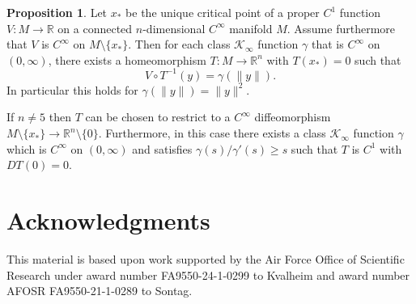 \documentclass[11pt]{amsart}
\newcommand{\R}{\mathbb{R}}
\theoremstyle{definition}
\newtheorem{Prop}{Proposition}
\begin{document}
\begin{Prop}\label{prop:gen-morse}
Let $x_*$ be the unique critical point of a proper $C^1$ function $V\colon M\to \R$ on a connected $n$-dimensional $C^\infty$ manifold $M$. 
Assume furthermore that $V$ is $C^\infty$ on $M\setminus \{x_*\}$.
Then for each class $\mathcal{K}_\infty$ function $\gamma$ that is $C^\infty$ on $(0,\infty)$, there exists a homeomorphism $T\colon M\to \R^n$ with $T(x_*)=0$ such that
\begin{equation*}
    V\circ T^{-1}(y)=\gamma(\|y\|).
\end{equation*}
In particular this holds for $\gamma(\|y\|)=\|y\|^2$.

If $n\neq 5$ then $T$ can be chosen to restrict to a $C^\infty$ diffeomorphism  $M\setminus \{x_*\} \to \R^n\setminus \{0\}$.
Furthermore, in this case there exists a class $\mathcal{K}_\infty$ function $\gamma$ which is $C^\infty$ on $(0,\infty)$ and satisfies $\gamma(s)/\gamma'(s)\geq s$ such that $T$ is $C^1$ with $DT(0)=0$.
\end{Prop}

\section*{Acknowledgments} This material is based upon work supported by the Air Force Office of Scientific Research under award number FA9550-24-1-0299 to Kvalheim and award number AFOSR FA9550-21-1-0289 to Sontag. 

	


	
	
\end{document}
